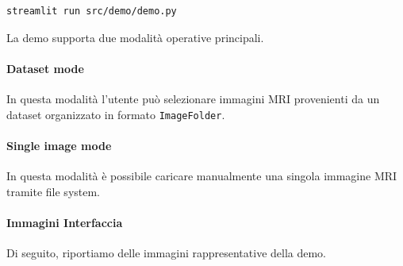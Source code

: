 \begin{verbatim}
streamlit run src/demo/demo.py
\end{verbatim}

La demo supporta due modalità operative principali.

\paragraph{Dataset mode}
In questa modalità l’utente può selezionare immagini MRI provenienti da un dataset organizzato in formato \texttt{ImageFolder}.  

\paragraph{Single image mode}
In questa modalità è possibile caricare manualmente una singola immagine MRI tramite file system. 

\paragraph{Immagini Interfaccia}
Di seguito, riportiamo delle immagini rappresentative della demo.

